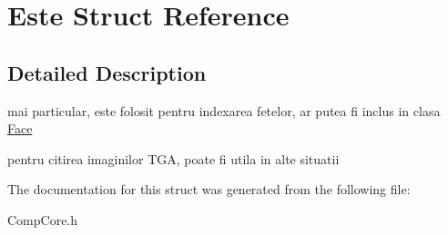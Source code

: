 \hypertarget{struct_este}{\section{Este Struct Reference}
\label{struct_este}
}


\subsection{Detailed Description}
mai particular, este folosit pentru indexarea fetelor, ar putea fi inclus in clasa \hyperlink{struct_face}{Face}

pentru citirea imaginilor T\-G\-A, poate fi utila in alte situatii 

The documentation for this struct was generated from the following file\-:\begin{DoxyCompactItemize}
\item 
Comp\-Core.\-h\end{DoxyCompactItemize}
